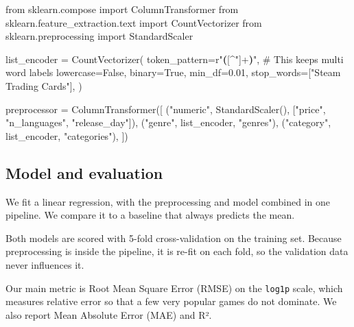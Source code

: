 \documentclass[
  letterpaper,
  DIV=11,
  numbers=noendperiod]{scrartcl}
\newenvironment{Shaded}{\begin{snugshade}}{\end{snugshade}}
\newcommand{\CommentTok}[1]{\textcolor[rgb]{0.37,0.37,0.37}{#1}}
\newcommand{\FloatTok}[1]{\textcolor[rgb]{0.68,0.00,0.00}{#1}}
\newcommand{\ImportTok}[1]{\textcolor[rgb]{0.00,0.46,0.62}{#1}}
\newcommand{\KeywordTok}[1]{\textcolor[rgb]{0.00,0.23,0.31}{\textbf{#1}}}
\newcommand{\NormalTok}[1]{\textcolor[rgb]{0.00,0.23,0.31}{#1}}
\newcommand{\OperatorTok}[1]{\textcolor[rgb]{0.37,0.37,0.37}{#1}}
\newcommand{\PreprocessorTok}[1]{\textcolor[rgb]{0.68,0.00,0.00}{#1}}
\newcommand{\StringTok}[1]{\textcolor[rgb]{0.13,0.47,0.30}{#1}}
\newcommand{\VariableTok}[1]{\textcolor[rgb]{0.07,0.07,0.07}{#1}}
\newcommand{\VerbatimStringTok}[1]{\textcolor[rgb]{0.13,0.47,0.30}{#1}}
\begin{document}
\begin{Shaded}
\begin{Highlighting}[]
\ImportTok{from}\NormalTok{ sklearn.compose }\ImportTok{import}\NormalTok{ ColumnTransformer}
\ImportTok{from}\NormalTok{ sklearn.feature\_extraction.text }\ImportTok{import}\NormalTok{ CountVectorizer}
\ImportTok{from}\NormalTok{ sklearn.preprocessing }\ImportTok{import}\NormalTok{ StandardScaler}

\NormalTok{list\_encoder }\OperatorTok{=}\NormalTok{ CountVectorizer(}
\NormalTok{    token\_pattern}\OperatorTok{=}\VerbatimStringTok{r\textquotesingle{}"}\KeywordTok{(}\PreprocessorTok{[\^{}"]}\OperatorTok{+}\KeywordTok{)}\VerbatimStringTok{"\textquotesingle{}}\NormalTok{, }\CommentTok{\# This keeps multi word labels}
\NormalTok{    lowercase}\OperatorTok{=}\VariableTok{False}\NormalTok{,}
\NormalTok{    binary}\OperatorTok{=}\VariableTok{True}\NormalTok{,}
\NormalTok{    min\_df}\OperatorTok{=}\FloatTok{0.01}\NormalTok{,}
\NormalTok{    stop\_words}\OperatorTok{=}\NormalTok{[}\StringTok{"Steam Trading Cards"}\NormalTok{],}
\NormalTok{)}

\NormalTok{preprocessor }\OperatorTok{=}\NormalTok{ ColumnTransformer([}
\NormalTok{    (}\StringTok{"numeric"}\NormalTok{, StandardScaler(), [}\StringTok{"price"}\NormalTok{, }\StringTok{"n\_languages"}\NormalTok{, }\StringTok{"release\_day"}\NormalTok{]),}
\NormalTok{    (}\StringTok{"genre"}\NormalTok{, list\_encoder, }\StringTok{"genres"}\NormalTok{),}
\NormalTok{    (}\StringTok{"category"}\NormalTok{, list\_encoder, }\StringTok{"categories"}\NormalTok{),}
\NormalTok{])}
\end{Highlighting}
\end{Shaded}

\subsection{Model and evaluation}\label{model-and-evaluation}

We fit a linear regression, with the preprocessing and model combined in
one pipeline. We compare it to a baseline that always predicts the mean.

Both models are scored with 5-fold cross-validation on the training set.
Because preprocessing is inside the pipeline, it is re-fit on each fold,
so the validation data never influences it.

Our main metric is Root Mean Square Error (RMSE) on the \texttt{log1p}
scale, which measures relative error so that a few very popular games do
not dominate. We also report Mean Absolute Error (MAE) and R².
\end{document}
